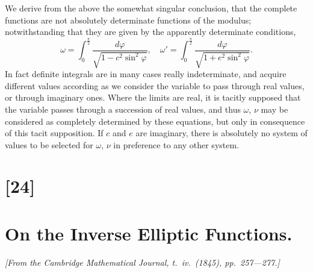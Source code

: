 \documentclass[12pt,a4paper]{article}
\begin{document}
We derive from the above the somewhat singular conclusion, that the complete
functions are not absolutely determinate functions of the modulus; notwithstanding
that they are given by the apparently determinate conditions,
\[
\omega = \int_0^{\frac{\pi}{2}} \frac{d\varphi}{\sqrt{1 - c^2 \sin^2 \varphi}},\quad
\omega' = \int_0^{\frac{\pi}{2}} \frac{d\varphi}{\sqrt{1 + e^2 \sin^2 \varphi}}.
\]
In fact definite integrals are in many cases really indeterminate, and acquire
different values according as we consider the variable to pass through real values, or
through imaginary ones. Where the limits are real, it is tacitly supposed that the
variable passes through a succession of real values, and thus $\omega$, $\nu$ may be considered
as completely determined by these equations, but only in consequence of this tacit
supposition. If $c$ and $e$ are imaginary, there is absolutely no system of values to be
selected for $\omega$, $\nu$ in preference to any other system.

\newpage
\section*{[24]}
\section*{On the Inverse Elliptic Functions.}

\textit{[From the Cambridge Mathematical Journal, t.~iv.~(1845), pp.~257---277.]}

\bigskip
\setcounter{page}{136}
\end{document}
